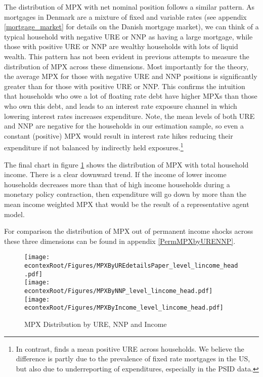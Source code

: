 \documentclass[titlepage]{\econtex}\newcommand{\texname}{ConsumptionHeterogeneity}
\begin{document}
The distribution of MPX with net nominal position follows a similar pattern. As mortgages in Denmark are a mixture of fixed and variable rates (see appendix \ref{mortgage_market} for details on the Danish mortgage market), we can think of a typical household with negative URE or NNP as having a large mortgage, while those with positive URE or NNP are wealthy households with lots of liquid wealth. This pattern has not been evident in previous attempts to measure the distribution of MPX across these dimensions. Most importantly for the theory, the average MPX for those with negative URE and NNP positions is significantly greater than for those with positive URE or NNP. This confirms the intuition that households who owe a lot of floating rate debt have higher MPXs than those who own this debt, and leads to an interest rate exposure channel in which lowering interest rates increases expenditure. Note, the mean levels of both URE and NNP are negative for the households in our estimation sample, so even a constant (positive) MPX would result in interest rate hikes reducing their expenditure if not balanced by indirectly held exposures.\footnote{In contrast, \cite{auclert_monetary_2017} finds a mean positive URE across households. We believe the difference is partly due to the prevalence of fixed rate mortgages in the US, but also due to underreporting of expenditures, especially in the PSID data.}

The final chart in figure \ref{fig:MPCAuclert} shows the distribution of MPX with total household income. There is a clear downward trend. If the income of lower income households decreases more than that of high income households during a monetary policy contraction, then expenditure will go down by more than the mean income weighted MPX that would be the result of a representative agent model.

For comparison the distribution of  MPX out of permanent income shocks across these three dimensions can be found in appendix \ref{PermMPXbyURENNP}.
\begin{figure} 
\begin{centering}
	\texttt{[image: \\econtexRoot/Figures/MPXByUREdetailsPaper\_level\_lincome\_head.pdf]} \\
	\texttt{[image: \\econtexRoot/Figures/MPXByNNP\_level\_lincome\_head.pdf]}
	\texttt{[image: \\econtexRoot/Figures/MPXByIncome\_level\_lincome\_head.pdf]}
	\caption{MPX Distribution by URE, NNP and Income}
	\label{fig:MPCAuclert}
\end{centering}
\end{figure}
\end{document}
